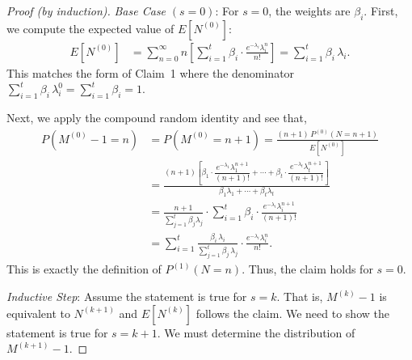 \documentclass[11pt]{amsart}
\theoremstyle{definition}
\theoremstyle{plain}
\begin{document}
\begin{proof}[Proof (by induction)]
\textit{Base Case} $(s = 0)$: For $s = 0$, the weights are $\beta_i$.  First, we compute
the expected value of $E[N^{(0)}]$:
\begin{align*}
E[N^{(0)}]
    &= \sum_{n=0}^{\infty} n \left[\sum_{i=1}^{t}\beta_i \cdot
       \frac{e^{-\lambda_i}\lambda_i^n}{n!}\right]
     = \sum_{i=1}^{t}\beta_i\,\lambda_i.
\end{align*}
This matches the form of Claim~1 where the denominator
$\sum_{i=1}^{t}\beta_i\,\lambda_i^0 = \sum_{i=1}^{t}\beta_i = 1$.

Next, we apply the compound random identity and see that,
\begin{align*}
P(M^{(0)} - 1 = n)
    &= P(M^{(0)} = n + 1)
     = \frac{(n+1)\,P^{(0)}(N = n+1)}{E[N^{(0)}]} \\
    &= \frac{(n+1)\!\left[\beta_1 \cdot
       \dfrac{e^{-\lambda_1}\lambda_1^{n+1}}{(n+1)!}
       + \cdots + \beta_t \cdot
       \dfrac{e^{-\lambda_t}\lambda_t^{n+1}}{(n+1)!}\right]}
      {\beta_1\lambda_1 + \cdots + \beta_t\lambda_t} \\
    &= \frac{n+1}{\sum_{j=1}^{t}\beta_j\lambda_j}
       \cdot \sum_{i=1}^{t}\beta_i \cdot
       \frac{e^{-\lambda_i}\lambda_i^{n+1}}{(n+1)!} \\
    &= \sum_{i=1}^{t}
       \frac{\beta_i\,\lambda_i}{\sum_{j=1}^{t}\beta_j\,\lambda_j}
       \cdot \frac{e^{-\lambda_i}\lambda_i^n}{n!}.
\end{align*}
This is exactly the definition of $P^{(1)}(N = n)$.  Thus, the claim holds for $s = 0$.

\medskip
\textit{Inductive Step}: Assume the statement is true for $s = k$.  That is, $M^{(k)} - 1$
is equivalent to $N^{(k+1)}$ and $E[N^{(k)}]$ follows the claim.  We need to show the
statement is true for $s = k + 1$.  We must determine the distribution of $M^{(k+1)} - 1$.


\end{proof}
\end{document}
